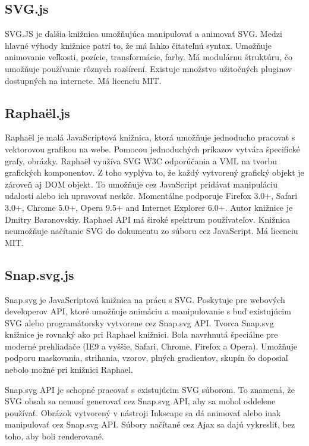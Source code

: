 \subsection{SVG.js}

SVG.JS je ďalšia knižnica umožňujúca manipulovať a animovať SVG. Medzi hlavné výhody knižnice patrí to, že má ľahko čitateľnú syntax. Umožňuje animovanie veľkosti, pozície, transformácie, farby. Má modulárnu štruktúru, čo umožňuje používanie rôznych rozšírení. Existuje množstvo užitočných pluginov dostupných na internete. \cite{svgjs}
Má licenciu MIT. 

\subsection{Raphaël.js}

Raphaël je malá JavaScriptová knižnica, ktorá umožňuje jednoducho pracovať s vektorovou grafikou na webe. Pomocou jednoduchých príkazov vytvára špecifické grafy, obrázky.  Raphaël využíva \acs{SVG} \acs{W3C} odporúčania a \acs{VML} na tvorbu grafických komponentov. Z toho vyplýva to, že každý vytvorený grafický objekt je zároveň aj DOM objekt. To umožňuje cez JavaScript pridávať manipuláciu udalostí alebo ich upravovať neskôr. Momentálne podporuje Firefox 3.0+, Safari 3.0+, Chrome 5.0+, Opera 9.5+ and Internet Explorer 6.0+.\cite{Raphael}
Autor knižnice je Dmitry Baranovskiy. Raphael \acs{API} má široké spektrum používateľov. Knižnica neumožňuje načítanie SVG do dokumentu zo súboru cez JavaScript. Má licenciu MIT. 

\subsection{Snap.svg.js}

Snap.svg je JavaScriptová knižnica na prácu s SVG. Poskytuje pre webových developerov \acs{API}, ktoré umožňuje animáciu a manipulovanie s buď existujúcim SVG alebo programátorsky vytvorene cez Snap.svg API. Tvorca Snap.svg knižnice je rovnaký ako pri Raphael knižnici.  Bola navrhnutá špeciálne pre moderné prehliadače (IE9 a vyššie, Safari, Chrome, Firefox a Opera). Umožňuje podporu maskovania, strihania, vzorov, plných gradientov, skupín čo doposiaľ nebolo možné pri knižnici Raphael. 

Snap.svg API je schopné pracovať s existujúcim SVG súborom. To znamená, že SVG obsah sa nemusí  generovať cez Snap.svg API, aby sa mohol oddelene používať. Obrázok vytvorený v nástroji  Inkscape sa dá animovať alebo inak manipulovať cez Snap.svg API. Súbory načítané cez Ajax sa dajú vykresliť, bez toho, aby boli renderované. 

